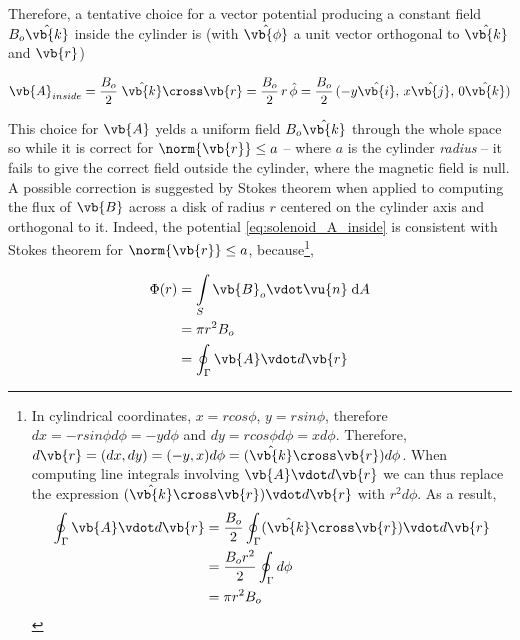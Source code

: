 Therefore, a tentative choice for a vector potential producing a constant field $B_o \hat{\vb{k}}$ inside the cylinder is (with $\hat{\vb{\phi}}$ a unit vector orthogonal to $\hat{\vb{k}}$ and $\vb{r}$)

\begin{equation}
\vb{A}_{inside} = \frac{B_o}{2} \; \hat{\vb{k}} \cross \vb{r} = \frac{B_o}{2} \, r \, \hat{\phi} =  \frac{B_o}{2} \, (-y  \hat{\vb{i}},\, x \hat{\vb{j}},\, 0 \hat{\vb{k}})
\label{eq:solenoid_A_inside}
\end{equation}

This choice for $\vb{A}$ yelds a uniform field $B_o \hat{\vb{k}}$  through the whole space 
so while it is correct for $\norm{\vb{r}} \le a$ -- where $a$ is the cylinder \textit{radius} -- it fails to give the correct field outside the cylinder, where the magnetic field is null. A possible correction is suggested by Stokes theorem when applied to computing the flux of $\vb{B}$ across a disk of radius $r$ centered on the cylinder axis and orthogonal to it. Indeed, the potential \ref{eq:solenoid_A_inside} is consistent with Stokes theorem for $\norm{\vb{r}} \le a$, because\footnote{
In cylindrical coordinates, $x = r cos \phi$, $y = r sin \phi$, therefore $dx = -r sin \phi d\phi = -y d\phi$ and $dy = r cos \phi d\phi = x d\phi$. Therefore, $d\vb{r} = (dx, dy) = (-y, x) d\phi = (\hat{\vb{k}} \cross \vb{r})d\phi$. When computing line integrals involving $\vb{A} \vdot d\vb{r}$ we can thus replace the expression $( \hat{\vb{k}} \cross \vb{r}) \vdot d\vb{r}$ with $r^2 d\phi$.   
As a result, 
\begin{equation*}
\begin{aligned}
\oint_{\Gamma} \vb{A} \vdot d\vb{r} &= \frac{B_o}{2} \oint_{\Gamma} (\hat{\vb{k}} \cross \vb{r}) \vdot d\vb{r} \\
&= \frac{B_o r^2}{2} \oint_{\Gamma} d\phi \\
&= \pi r^2 B_o 
\end{aligned}                     
\end{equation*}
},	%

\begin{equation}
\begin{aligned}
\Phi(r) &= \int\limits_{S} \vb{B}_o \vdot \vu{n} \; \mathrm{d}A \\
&= \pi r^2 B_{o} \\
&= \oint_{\Gamma} \vb{A} \vdot d\vb{r}
\end{aligned}
\label{eq:solenoid_Flux_inside} 
\end{equation}

